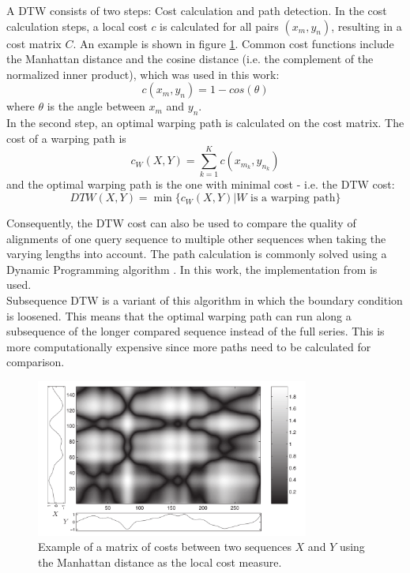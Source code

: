 A DTW consists of two steps: Cost calculation and path detection. In the cost calculation steps, a local cost $c$ is calculated for all pairs $(x_m, y_n)$, resulting in a cost matrix $C$. An example is shown in figure \ref{fig:dtw_cost}. Common cost functions include the Manhattan distance and the cosine distance (i.e. the complement of the normalized inner product), which was used in this work:
\begin{equation}
c(x_m,y_n) =  1 - cos(\theta)
\end{equation}
where $\theta$ is the angle between $x_m$ and $y_n$.\\

In the second step, an optimal warping path is calculated on the cost matrix. The cost of a warping path is
\begin{equation}
c_W(X,Y) =  \sum_{k=1}^{K} c(x_{m_k}, y_{n_k})
\end{equation}
and the optimal warping path is the one with minimal cost - i.e. the DTW cost:
\begin{equation}
DTW(X,Y) =  \min\{c_W(X,Y)|W \text{ is a warping path}\}
\end{equation}

Consequently, the DTW cost can also be used to compare the quality of alignments of one query sequence to multiple other sequences when taking the varying lengths into account.
The path calculation is commonly solved using a Dynamic Programming algorithm \cite{meinard_retrieval}. In this work, the implementation from \cite{ellis_dtw} is used.\\

Subsequence DTW is a variant of this algorithm in which the boundary condition is loosened. This means that the optimal warping path can run along a subsequence of the longer compared sequence instead of the full series. This is more computationally expensive since more paths need to be calculated for comparison.

\begin{figure}
	\begin{center}
		\includegraphics[width=0.8\textwidth]{images/dtw_cost.png}
		\caption{Example of a matrix of costs between two sequences $X$ and $Y$ using the Manhattan distance as the local cost measure. \cite{meinard_retrieval}}
			\label{fig:dtw_cost}
		\end{center}
	\end{figure}


